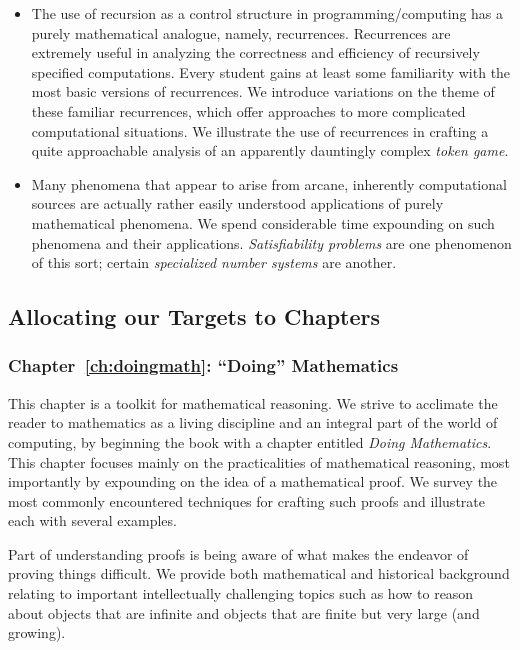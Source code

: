 \begin{enumerate}
\begin{itemize}
\item
The use of recursion as a control structure in programming/computing has a purely mathematical analogue, namely, recurrences.  Recurrences are extremely useful in analyzing the correctness and efficiency of recursively specified computations.  Every student gains at least some familiarity with the most basic versions of recurrences.  We introduce variations on the theme of these familiar recurrences, which offer approaches to more complicated computational situations.  We illustrate the use of recurrences in crafting a quite approachable analysis of an apparently dauntingly complex {\em token game}.
\item
Many phenomena that appear to arise from arcane, inherently computational sources are actually rather easily understood applications of purely mathematical phenomena.  We spend considerable time expounding on such phenomena and their applications.   {\em Satisfiability problems} are one phenomenon of this sort; certain {\em specialized number systems} are another.
\end{itemize}
\end{enumerate}


\subsection{Allocating our Targets to Chapters}
\label{sec:the chapters}

\subsubsection{Chapter~\ref{ch:doingmath}: ``Doing'' Mathematics}

This chapter is a toolkit for mathematical reasoning.  We strive to acclimate the reader to mathematics as a living discipline and an integral part of the world of computing, by beginning the book with a chapter entitled {\it Doing Mathematics}.  This chapter focuses mainly on the practicalities of mathematical reasoning, most importantly by expounding on the idea of a mathematical proof.  We survey the most commonly encountered techniques for crafting such
proofs and illustrate each with several examples.

\smallskip

Part of understanding proofs is being aware of what makes the endeavor of proving things difficult.  We provide both mathematical and historical background relating to important intellectually challenging topics such as how to reason about objects that are infinite and objects that are finite but very large (and growing).

